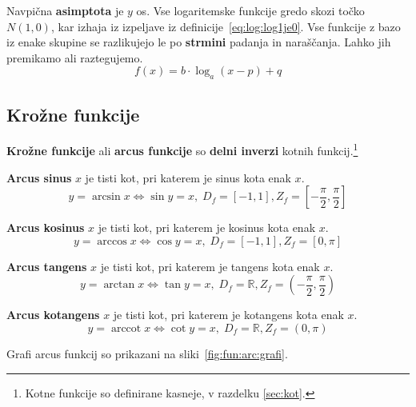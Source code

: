 \documentclass[a4paper,oneside,12pt,fleqn]{article}
\def\R{\ensuremath{\mathbb R}}
\newcommand\krat\cdot
\newcommand{\arccot}{\ensuremath{\operatorname{arccot}}} %
\def\kos{\cos}
\renewcommand\iff\Leftrightarrow
\numberwithin{equation}{section}
\begin{document}
Navpična \textbf{asimptota} je $y$ os. Vse logaritemske funkcije gredo skozi točko $N(1,0)$, kar
izhaja iz izpeljave iz definicije~\eqref{eq:log:log1je0}. Vse funkcije z bazo iz enake 
skupine se razlikujejo le
po \textbf{strmini} padanja in naraščanja. Lahko jih premikamo ali raztegujemo.
\[ f(x) = b\krat\log_a\!(x-p) + q \]

\subsection{Krožne funkcije}
\label{sec:fun:arc}
\textbf{Krožne funkcije} ali \textbf{arcus funkcije} so \textbf{delni inverzi} kotnih funkcij.\footnote{Kotne funkcije
so definirane kasneje, v razdelku \ref{sec:kot}.}

\textbf{Arcus sinus} $x$ je tisti kot, pri katerem je sinus kota enak $x$.
\[ y = \arcsin x \iff \sin y = x, \; D_f = [-1,1], Z_f = \left[ -\frac{\pi}{2},
\frac{\pi}{2} \right] \]

\textbf{Arcus kosinus} $x$ je tisti kot, pri katerem je kosinus kota enak $x$.
\[ y = \arccos x \iff \kos y = x, \; D_f = [-1,1], Z_f = \left[0, \pi \right] \]

\textbf{Arcus tangens} $x$ je tisti kot, pri katerem je tangens kota enak $x$.
\[ y = \arctan x \iff \tan y = x, \; D_f = \R, Z_f = \left( -\frac{\pi}{2},
\frac{\pi}{2} \right) \]

\textbf{Arcus kotangens} $x$ je tisti kot, pri katerem je kotangens kota enak $x$.
\[ y = \arccot x \iff \cot y = x, \; D_f = \R, Z_f = \left(0, \pi \right) \]

Grafi arcus funkcij so prikazani na sliki~\ref{fig:fun:arc:grafi}.
\end{document}
